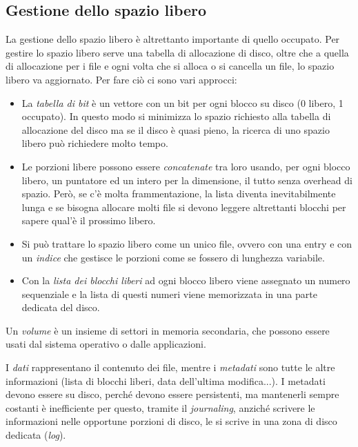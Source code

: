 \subsection*{Gestione dello spazio libero}
La gestione dello spazio libero è altrettanto importante di quello occupato. Per gestire lo spazio libero serve una tabella di allocazione di disco, oltre che a quella di allocazione per i file e ogni volta che si alloca o si cancella un file, lo spazio libero va aggiornato. Per fare ciò ci sono vari approcci:
\begin{itemize}
    \item La \textit{tabella di bit} è un vettore con un bit per ogni blocco su disco (0 libero, 1 occupato). In questo modo si minimizza lo spazio richiesto alla tabella di allocazione del disco ma se il disco è quasi pieno, la ricerca di uno spazio libero può richiedere molto tempo.

    \item Le porzioni libere possono essere \textit{concatenate} tra loro usando, per ogni blocco libero, un puntatore ed un intero per la dimensione, il tutto senza overhead di spazio. Però, se c'è molta frammentazione, la lista diventa inevitabilmente lunga e se bisogna allocare molti file si devono leggere altrettanti blocchi per sapere qual'è il prossimo libero.

    \item Si può trattare lo spazio libero come un unico file, ovvero con una entry e con un \textit{indice} che gestisce le porzioni come se fossero di lunghezza variabile.

    \item Con la \textit{lista dei blocchi liberi} ad ogni blocco libero viene assegnato un numero sequenziale e la lista di questi numeri viene memorizzata in una parte dedicata del disco.
\end{itemize}

Un \textit{volume} è un insieme di settori in memoria secondaria, che possono essere usati dal sistema operativo o dalle applicazioni.

I \textit{dati} rappresentano il contenuto dei file, mentre i \textit{metadati} sono tutte le altre informazioni (lista di blocchi liberi, data dell'ultima modifica...). I metadati devono essere su disco, perché devono essere persistenti, ma mantenerli sempre costanti è inefficiente per questo, tramite il \textit{journaling}, anziché scrivere le informazioni nelle opportune porzioni di disco, le si scrive in una zona di disco dedicata (\textit{log}).

